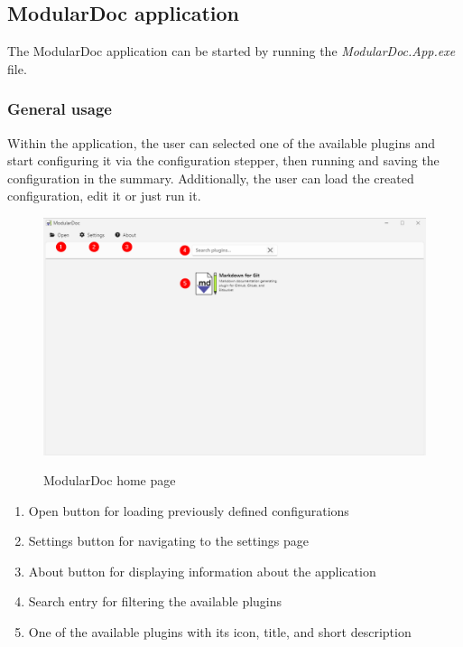 \subsection{ModularDoc application}

The ModularDoc application can be started by running the \textit{ModularDoc.App.exe} file.

\subsubsection{General usage}

Within the application, the user can selected one of the available plugins and start configuring it via the configuration stepper, then running and saving the configuration in the summary.
Additionally, the user can load the created configuration, edit it or just run it. 

\begin{figure}[H]
    \includegraphics[width=\linewidth]{img/modularDocHomePage.png}
    \label{fig:modularDocHome}
    \caption{ModularDoc home page}
\end{figure}

\begin{enumerate}
    \item Open button for loading previously defined configurations
    \item Settings button for navigating to the settings page
    \item About button for displaying information about the application
    \item Search entry for filtering the available plugins
    \item One of the available plugins with its icon, title, and short description
\end{enumerate}

